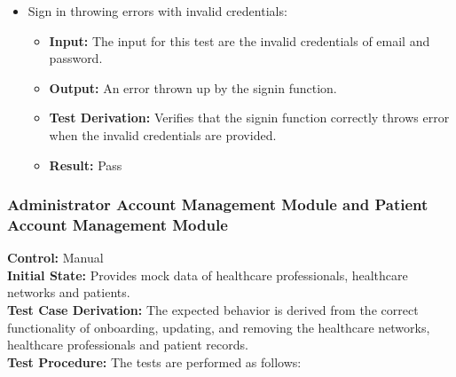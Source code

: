 \documentclass[12pt, titlepage]{article}
\begin{document}
\begin{itemize}
    \item Sign in throwing errors with invalid credentials:
      \begin{itemize}
        \item \textbf{Input:} The input for this test are the invalid credentials of email and password. 
        \item \textbf{Output:} An error thrown up by the signin function.
        \item \textbf{Test Derivation:} Verifies that the signin function correctly throws error when the invalid credentials are provided.
        \item \textbf{Result:} Pass 
      \end{itemize}
  \end{itemize}


\subsubsection{Administrator Account Management Module and Patient Account Management Module}

  \textbf{Control:} Manual\\
  \textbf{Initial State:} Provides mock data of healthcare professionals, healthcare networks and patients.\\
  \textbf{Test Case Derivation:} The expected behavior is derived from the correct functionality of onboarding, updating, and removing the healthcare networks, healthcare professionals and patient records.\\
  \textbf{Test Procedure:} The tests are performed as follows:\\
\end{document}
